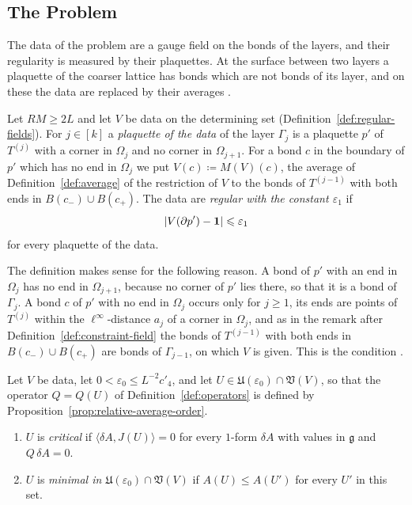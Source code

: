 \documentclass[11pt]{preprint}
\newcommand{\id}{\mathbf 1}
\DeclarePairedDelimiter{\abs}{\lvert}{\rvert}
\numberwithin{equation}{section}
\begin{document}
\subsection{The Problem}\label{sec:problem}

The data of the problem are a gauge field on the bonds of the layers, and their regularity is measured by their plaquettes. At the surface between two layers a plaquette of the coarser lattice has bonds which are not bonds of its layer, and on these the data are replaced by their averages \cite[p.~278]{BalabanVAR}.

\begin{definition}\label{def:regular-data}
Let $RM \geqslant 2L$ and let $V$ be data on the determining set (Definition~\ref{def:regular-fields}). For $j \in [k]$ a \emph{plaquette of the data} of the layer $\Gamma_j$ is a plaquette $p'$ of $T^{(j)}$ with a corner in $\Omega_j$ and no corner in $\Omega_{j+1}$. For a bond $c$ in the boundary of $p'$ which has no end in $\Omega_j$ we put $V(c) \coloneqq M(V)(c)$, the average of Definition~\ref{def:average} of the restriction of $V$ to the bonds of $T^{(j-1)}$ with both ends in $B(c_-) \cup B(c_+)$. The data are \emph{regular with the constant $\varepsilon_1$} if
\begin{equation}\label{eq:regular-data}
    \abs{V(\partial p') - \id} \leqslant \varepsilon_1
\end{equation}
for every plaquette of the data.
\end{definition}

The definition makes sense for the following reason. A bond of $p'$ with an end in $\Omega_j$ has no end in $\Omega_{j+1}$, because no corner of $p'$ lies there, so that it is a bond of $\Gamma_j$. A bond $c$ of $p'$ with no end in $\Omega_j$ occurs only for $j \geqslant 1$, its ends are points of $T^{(j)}$ within the $\ell^\infty$-distance $a_j$ of a corner in $\Omega_j$, and as in the remark after Definition~\ref{def:constraint-field} the bonds of $T^{(j-1)}$ with both ends in $B(c_-) \cup B(c_+)$ are bonds of $\Gamma_{j-1}$, on which $V$ is given. This is the condition \cite[(7), p.~278]{BalabanVAR}.

\begin{definition}\label{def:minimal}
Let $V$ be data, let $0 < \varepsilon_0 \leqslant L^{-2}c'_4$, and let $U \in \mathfrak U(\varepsilon_0) \cap \mathfrak V(V)$, so that the operator $Q = Q(U)$ of Definition~\ref{def:operators} is defined by Proposition~\ref{prop:relative-average-order}.
\begin{enumerate}[label=(\roman*)]
\item $U$ is \emph{critical} if $\langle\delta A, J(U)\rangle = 0$ for every $1$-form $\delta A$ with values in $\mathfrak g$ and $Q\,\delta A = 0$.
\item $U$ is \emph{minimal in $\mathfrak U(\varepsilon_0) \cap \mathfrak V(V)$} if $A(U) \leqslant A(U')$ for every $U'$ in this set.
\end{enumerate}
\end{definition}
\end{document}
